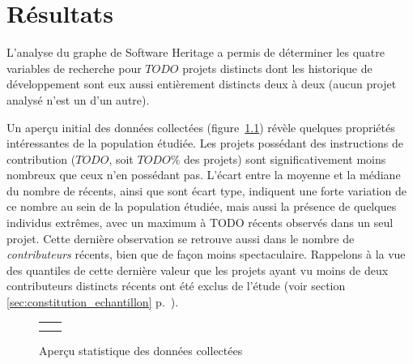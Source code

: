 \chapter{Résultats}

\captionsetup[figure]{format=plain,singlelinecheck=true,justification=centering}
\captionsetup[subfigure]{format=plain,singlelinecheck=true,justification=centering}


L'analyse du graphe de Software Heritage a permis de déterminer les quatre variables de recherche pour $TODO$
projets distincts dont les historique de développement sont eux aussi entièrement distincts deux à deux (aucun
projet analysé n'est un  d'un autre).

Un aperçu initial des données collectées (figure~\ref{fig:data_description}) révèle quelques propriétés
intéressantes de la population étudiée. Les projets possédant des instructions de contribution ($TODO$, soit
$TODO\%$ des projets) sont significativement moins nombreux que ceux n'en possédant pas. L'écart entre la
moyenne et la médiane du nombre de  récents, ainsi que sont écart type, indiquent une forte
variation de ce nombre au sein de la population étudiée, mais aussi la présence de quelques individus
extrêmes, avec un maximum à TODO  récents observés dans un seul projet. Cette dernière
observation se retrouve aussi dans le nombre de \emph{contributeurs} récents, bien que de façon moins
spectaculaire. Rappelons à la vue des quantiles de cette dernière valeur que les projets ayant vu moins de
deux contributeurs distincts récents ont été exclus de l'étude (voir section
\ref{sec:constitution_echantillon} p.~\pageref{sec:constitution_echantillon}).

\begin{figure}
    \centering
    \begin{tabular}{cc}
         &
        
        \\
         &
        
    \end{tabular}

    \caption{Aperçu statistique des données collectées}
    \label{fig:data_description}
\end{figure}

